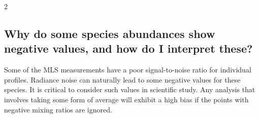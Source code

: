 \begin{multicols}{2}
  \subsection*{Why do some species abundances show negative values, and how do I
    interpret these?}

  Some of the MLS measurements have a poor signal-to-noise ratio for individual profiles. Radiance noise can naturally lead to some negative values for these species. It is critical to consider such values in scientific study. Any analysis that involves taking some form of average will exhibit a high bias if the points with negative mixing ratios are ignored.

\end{multicols}
